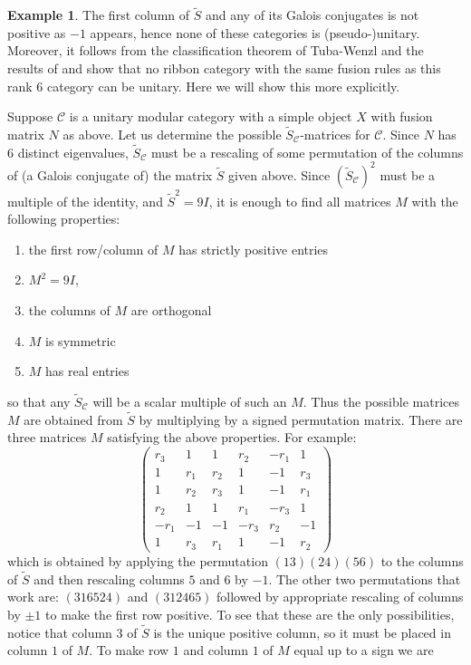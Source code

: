 \documentclass[12pt,psamsfonts]{amsart}
\newcommand{\CC}{\mathcal{C}}
\newcommand{\tS}{\tilde{S}}
\numberwithin{equation}{section}
\theoremstyle{definition}
\newtheorem{ex}[theorem]{Example}
\begin{document}
\begin{ex}
The first column of $\tS$ and any of its Galois conjugates is not
positive as $-1$ appears, hence none of these categories is
(pseudo-)unitary. Moreover, it follows from the classification
theorem of Tuba-Wenzl \cite{TuWe} and the results of
\cite{rowellmathz} and \cite{grunit} show that no ribbon category
with the same fusion rules as this rank $6$ category can be
unitary.  Here we will show this more explicitly.

Suppose $\CC$ is a unitary modular category with a simple object
$X$ with fusion matrix $N$ as above.  Let us determine the
possible $\tS_\CC$-matrices for $\CC$.  Since $N$ has $6$ distinct
eigenvalues, $\tS_\CC$ must be a rescaling of some permutation of
the columns of (a Galois conjugate of) the matrix $\tS$ given
above.  Since $(\tS_\CC)^2$ must be a multiple of the identity,
and $\tS^2=9I$, it is enough to find all matrices $M$ with the
following properties:
\begin{enumerate}
\item[(1)] the first row/column of $M$ has strictly positive
entries \item[(2)] $M^2=9I$, \item[(3)] the columns of $M$ are
orthogonal \item[(4)] $M$ is symmetric \item[(5)] $M$ has real
entries
\end{enumerate}
so that any $\tS_\CC$ will be a scalar multiple of such an $M$.
Thus the possible matrices $M$ are obtained from $\tS$ by
multiplying by a signed permutation matrix.  There are three
matrices $M$ satisfying the above properties.  For example:
$$\begin{pmatrix}
r_3&1&1&r_2&-r_1&1
\\ 1&r_1&r_2&1&-1
&r_3
\\ 1&r_2& r_3&1&-1&r_1
\\r_2&1&1&r_1&-r_3&1
\\-r_1&-1&-1&-r_3&r_2&-1\\ 1&r_3&r_1&1&-1&r_2
\end{pmatrix}$$
which is obtained by applying the permutation $(1 3)(2 4)(5 6)$ to
the columns of $\tS$ and then rescaling columns $5$ and $6$ by
$-1$.  The other two permutations that work are: $(3 1 6 5 2 4)$
and $(3 1 2 4 6 5)$ followed by appropriate rescaling of columns
by $\pm 1$ to make the first row positive.  To see that these are
the only possibilities, notice that column $3$ of $\tS$ is the
unique positive column, so it must be placed in column $1$ of $M$.
To make row $1$ and column $1$ of $M$ equal up to a sign we are

\end{ex}
\end{document}
